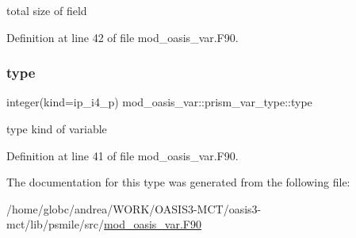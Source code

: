 total size of field 



Definition at line 42 of file mod\+\_\+oasis\+\_\+var.\+F90.

\mbox{\label{structmod__oasis__var_1_1prism__var__type_a944549d5fb1aebecc59ca5dbff9b3222}} 
\subsubsection{\texorpdfstring{type}{type}}
{\footnotesize\ttfamily integer(kind=ip\+\_\+i4\+\_\+p) mod\+\_\+oasis\+\_\+var\+::prism\+\_\+var\+\_\+type\+::type\hspace{0.3cm}{\ttfamily [private]}}



type kind of variable 



Definition at line 41 of file mod\+\_\+oasis\+\_\+var.\+F90.



The documentation for this type was generated from the following file\+:\begin{DoxyCompactItemize}
\item 
/home/globc/andrea/\+W\+O\+R\+K/\+O\+A\+S\+I\+S3-\/\+M\+C\+T/oasis3-\/mct/lib/psmile/src/\hyperlink{mod__oasis__var_8_f90}{mod\+\_\+oasis\+\_\+var.\+F90}\end{DoxyCompactItemize}
